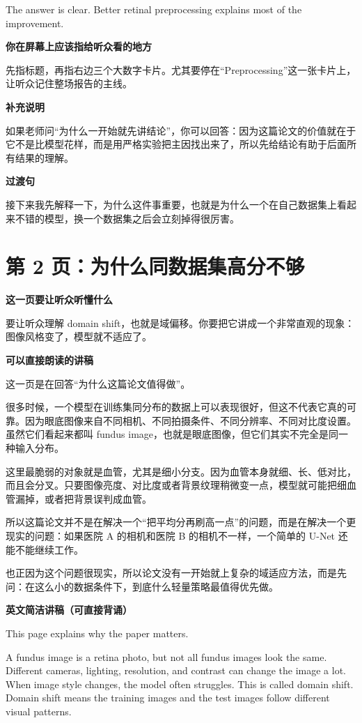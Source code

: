 \documentclass[12pt,a4paper]{ctexart}
\newcommand{\EnglishScriptHeading}{\textbf{\color{AccentGreen}英文简洁讲稿（可直接背诵）}}
\begin{document}
The answer is clear. Better retinal preprocessing explains most of the improvement.

\textbf{你在屏幕上应该指给听众看的地方}

先指标题，再指右边三个大数字卡片。尤其要停在“Preprocessing”这一张卡片上，让听众记住整场报告的主线。

\textbf{补充说明}

如果老师问“为什么一开始就先讲结论”，你可以回答：因为这篇论文的价值就在于它不是比模型花样，而是用严格实验把主因找出来了，所以先给结论有助于后面所有结果的理解。

\textbf{过渡句}

接下来我先解释一下，为什么这件事重要，也就是为什么一个在自己数据集上看起来不错的模型，换一个数据集之后会立刻掉得很厉害。

\section*{第 2 页：为什么同数据集高分不够}

\textbf{这一页要让听众听懂什么}

要让听众理解 domain shift，也就是域偏移。你要把它讲成一个非常直观的现象：图像风格变了，模型就不适应了。

\textbf{可以直接朗读的讲稿}

这一页是在回答“为什么这篇论文值得做”。

很多时候，一个模型在训练集同分布的数据上可以表现很好，但这不代表它真的可靠。因为眼底图像来自不同相机、不同拍摄条件、不同分辨率、不同对比度设置。虽然它们看起来都叫 fundus image，也就是眼底图像，但它们其实不完全是同一种输入分布。

这里最脆弱的对象就是血管，尤其是细小分支。因为血管本身就细、长、低对比，而且会分叉。只要图像亮度、对比度或者背景纹理稍微变一点，模型就可能把细血管漏掉，或者把背景误判成血管。

所以这篇论文并不是在解决一个“把平均分再刷高一点”的问题，而是在解决一个更现实的问题：如果医院 A 的相机和医院 B 的相机不一样，一个简单的 U-Net 还能不能继续工作。

也正因为这个问题很现实，所以论文没有一开始就上复杂的域适应方法，而是先问：在这么小的数据条件下，到底什么轻量策略最值得优先做。

\EnglishScriptHeading

This page explains why the paper matters.

A fundus image is a retina photo, but not all fundus images look the same. Different cameras, lighting, resolution, and contrast can change the image a lot. When image style changes, the model often struggles. This is called domain shift. Domain shift means the training images and the test images follow different visual patterns.
\end{document}
